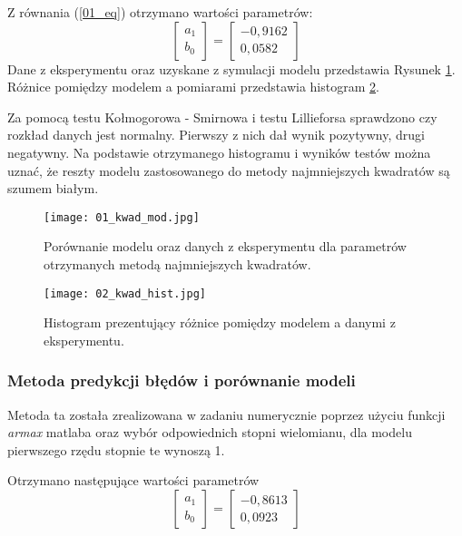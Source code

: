 \documentclass[a4paper,15pt]{article}
\begin{document}
Z równania (\ref{01_eq}) otrzymano wartości parametrów:
\begin{equation}
\begin{bmatrix}
a_1 \\
b_0 
\end{bmatrix}
=
\begin{bmatrix}
-0,9162 \\
0,0582
\end{bmatrix}
\end{equation}
Dane z eksperymentu oraz uzyskane z symulacji modelu przedstawia Rysunek \ref{fig:01_kwad_mod}. Różnice pomiędzy modelem a pomiarami przedstawia histogram \ref{fig:01_kwad_hist}. 

Za pomocą testu Kołmogorowa - Smirnowa i testu Lillieforsa sprawdzono czy rozkład danych jest normalny. Pierwszy z nich dał wynik pozytywny, drugi negatywny. Na podstawie otrzymanego histogramu i wyników testów można uznać, że reszty modelu zastosowanego do metody najmniejszych kwadratów są szumem białym. 

\begin{figure}[H]
\centerline{\texttt{[image: 01\_kwad\_mod.jpg]}}
\centering
\caption{Porównanie modelu oraz danych z eksperymentu dla parametrów otrzymanych metodą najmniejszych kwadratów.}
\label{fig:01_kwad_mod}
\end{figure}

\begin{figure}[H]
\centerline{\texttt{[image: 02\_kwad\_hist.jpg]}}
\centering
\caption{Histogram prezentujący różnice pomiędzy modelem a danymi z eksperymentu.}
\label{fig:01_kwad_hist}
\end{figure}

\subsubsection{Metoda predykcji błędów i porównanie modeli}
Metoda ta została zrealizowana w zadaniu numerycznie poprzez użyciu funkcji \textit{armax} matlaba oraz wybór odpowiednich stopni wielomianu, dla modelu pierwszego rzędu stopnie te wynoszą 1.

Otrzymano następujące wartości parametrów
\begin{equation}
\begin{bmatrix}
a_1 \\
b_0 
\end{bmatrix}
=
\begin{bmatrix}
-0,8613 \\
0,0923
\end{bmatrix}
\end{equation}
\end{document}
